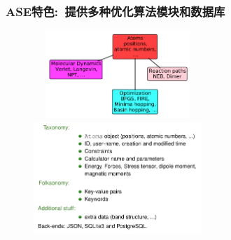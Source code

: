 \frame
{
\frametitle{\textrm{ASE}特色:~提供多种优化算法模块和数据库}
\begin{figure}[h!]
\centering
\vspace*{-0.18in}
\includegraphics[height=1.3in,width=2.5in,viewport=0 0 838 500,clip]{Figures/ASE_opt_modules.png}
\vskip 1pt
\includegraphics[height=1.7in,width=2.5in,viewport=0 0 938 630,clip]{Figures/ASE_database.png}
\label{ASE_opt-database}
\end{figure} 
}

